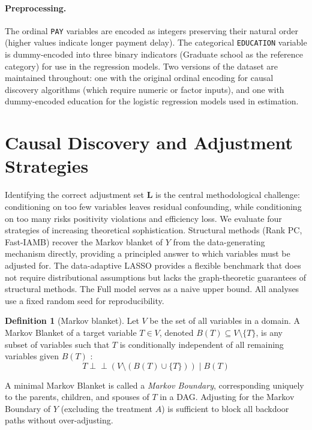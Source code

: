\documentclass[11pt, a4paper]{article}
\theoremstyle{definition}
\newtheorem{definition}{Definition}[section]
\begin{document}
\paragraph{Preprocessing.}
The ordinal \texttt{PAY} variables are encoded as integers preserving their natural order
(higher values indicate longer payment delay). The categorical \texttt{EDUCATION} variable
is dummy-encoded into three binary indicators (Graduate school as the reference category)
for use in the regression models. Two versions of the dataset are maintained throughout:
one with the original ordinal encoding for causal discovery algorithms (which require
numeric or factor inputs), and one with dummy-encoded education for the logistic regression
models used in estimation.

\section{Causal Discovery and Adjustment Strategies}

Identifying the correct adjustment set $\mathbf{L}$ is the central methodological challenge:
conditioning on too few variables leaves residual confounding, while conditioning on too
many risks positivity violations and efficiency loss. We evaluate four strategies of
increasing theoretical sophistication. Structural methods (Rank PC, Fast-IAMB) recover the
Markov blanket of $Y$ from the data-generating mechanism directly, providing a principled
answer to which variables must be adjusted for. The data-adaptive LASSO provides a flexible
benchmark that does not require distributional assumptions but lacks the graph-theoretic
guarantees of structural methods. The Full model serves as a naive upper bound. All analyses
use a fixed random seed for reproducibility.

\begin{definition}[Markov blanket]
Let $V$ be the set of all variables in a domain. A Markov Blanket of a target variable
$T \in V$, denoted $B(T) \subseteq V \setminus \{T\}$, is any subset of variables such
that $T$ is conditionally independent of all remaining variables given $B(T)$
\cite{pearl2009causality}:
\begin{equation*}
    T \perp\!\!\!\perp (V \setminus (B(T) \cup \{T\})) \mid B(T)
\end{equation*}
\end{definition}
A minimal Markov Blanket is called a \textit{Markov Boundary}, corresponding uniquely to
the parents, children, and spouses of $T$ in a DAG. Adjusting for the Markov Boundary of
$Y$ (excluding the treatment $A$) is sufficient to block all backdoor paths without
over-adjusting.
\end{document}
